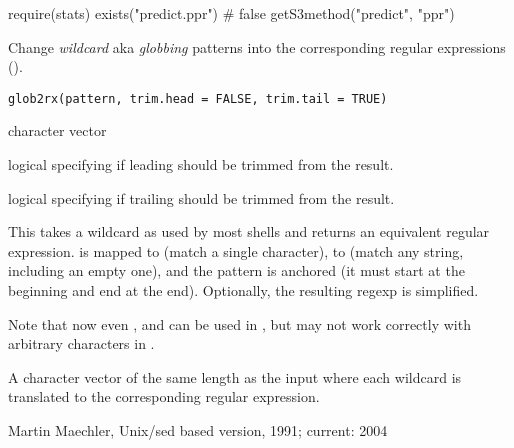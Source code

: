 %
\begin{Examples}
\begin{ExampleCode}
require(stats)
exists("predict.ppr") # false
getS3method("predict", "ppr")
\end{ExampleCode}
\end{Examples}
%
\begin{Description}\relax
Change \emph{wildcard} aka \emph{globbing} patterns into the
corresponding regular expressions ().
\end{Description}
%
\begin{Usage}
\begin{verbatim}
glob2rx(pattern, trim.head = FALSE, trim.tail = TRUE)
\end{verbatim}
\end{Usage}
%
\begin{Arguments}
\begin{ldescription}
\item[\code{pattern}] character vector
\item[\code{trim.head}] logical specifying if leading  should be
trimmed from the result.
\item[\code{trim.tail}] logical specifying if trailing  should be
trimmed from the result.
\end{ldescription}
\end{Arguments}
%
\begin{Details}\relax
This takes a wildcard as used by most shells and returns an equivalent
regular expression.   is mapped to  (match a single
character), \code{*} to  (match any string, including an
empty one), and the pattern is anchored (it must start at the
beginning and end at the end).  Optionally, the resulting regexp is
simplified.

Note that now even \code{(}, \code{[} and \code{\{} can be used
in , but  may not work correctly with
arbitrary characters in .
\end{Details}
%
\begin{Value}
A character vector of the same length as the input 
where each wildcard is translated to the corresponding
regular expression.
\end{Value}
%
\begin{Author}\relax
Martin Maechler, Unix/sed based version, 1991; current: 2004
\end{Author}
